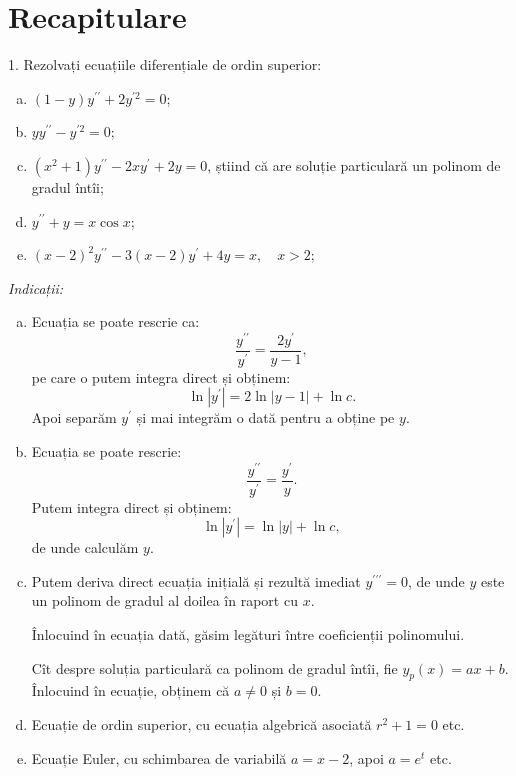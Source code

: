 
\chapter{Recapitulare}

1. Rezolvați ecuațiile diferențiale de ordin superior:
\begin{enumerate}[(a)]
    \item $ (1 - y)y^{\prime\prime} + 2y^{\prime 2} = 0 $;
    \item $ yy^{\prime\prime} - y^{\prime 2} = 0 $;
    \item $ (x^2 + 1) y^{\prime\prime} - 2xy^{\prime} + 2y = 0 $, știind că are soluție
        particulară un polinom de gradul întîi;
    \item $ y^{\prime\prime} + y = x \cos x $;
    \item $ (x - 2)^2 y^{\prime\prime} - 3(x - 2) y^{\prime} + 4y = x, \quad x > 2 $;
\end{enumerate}

\emph{Indicații:}
\begin{enumerate}[(a)]
    \item Ecuația se poate rescrie ca:
        \[
            \dfrac{y^{\prime\prime}}{y^\prime} = \dfrac{2y^\prime}{y-1},
        \]
        pe care o putem integra direct și obținem:
        \[
            \ln |y^\prime| = 2 \ln |y-1| + \ln c.
        \]
        Apoi separăm $ y^\prime $ și mai integrăm o dată pentru a obține pe $ y $.
    \item Ecuația se poate rescrie:
        \[
            \dfrac{y^{\prime\prime}}{y^\prime} = \dfrac{y^\prime}{y}.
        \]
        Putem integra direct și obținem:
        \[
            \ln |y^\prime| = \ln |y| + \ln c,
        \]
        de unde calculăm $ y $.
    \item Putem deriva direct ecuația inițială și rezultă imediat $ y^{\prime\prime\prime} = 0 $,
        de unde $ y $ este un polinom de gradul al doilea în raport cu $ x $.

        Înlocuind în ecuația dată, găsim legături între coeficienții polinomului.

        Cît despre soluția particulară ca polinom de gradul întîi, fie $ y_p(x) = ax + b $.
        Înlocuind în ecuație, obținem că $ a \neq 0 $ și $ b = 0 $.
    \item Ecuație de ordin superior, cu ecuația algebrică asociată $ r^2 + 1 = 0 $ etc.
    \item Ecuație Euler, cu schimbarea de variabilă $ a = x - 2 $, apoi $ a = e^t $ etc.
\end{enumerate}

